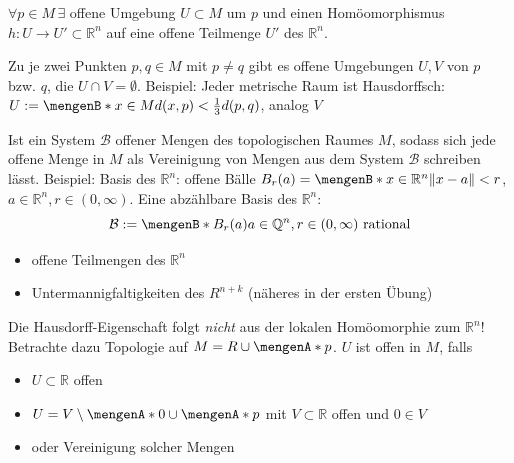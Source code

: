 \begin{description}
	\item{}  $\forall p \in M \, \exists$ offene Umgebung $U \subset M$ um $p$ und einen Homöomorphismus $h : U \to U' \subset \mathds{R}^n$  auf 
	eine offene Teilmenge $U'$ des $\mathds{R}^n$. 
	\item{}  Zu je zwei Punkten $p, q \in M$ mit $p \not= q$ gibt es offene Umgebungen $U,V$ von $p$ bzw. $q$, die $U \cap V = \emptyset$. Beispiel: Jeder
	metrische Raum ist Hausdorffsch: $U := \set[x \in M]{d(x,p)< \frac{1}{3} d(p,q) } $, analog $V$ \\
	\item{}  Ist ein System $\mathcal{B}$ offener Mengen des topologischen Raumes $M$, sodass sich jede offene Menge in $M$ als 
	Vereinigung von Mengen aus 
	dem System $\mathcal{B}$ schreiben lässt. \newline Beispiel: Basis des $\mathds{R}^n$: offene Bälle 
	$B_r(a) = \set[x \in \mathds{R}^n]{\norm{x-a} < r } $, $a \in \mathds{R}^n, r \in (0, \infty)$. Eine abzählbare Basis des $\mathds{R}^n$: 
	\[
		\mathcal{B} := \set[B_r(a)]{a \in \mathds{Q}^n, r \in (0,\infty) \text{ rational}} 
	\]
\end{description}


\begin{itemize}
	\item offene Teilmengen des $\mathds{R}^n$
	\item Untermannigfaltigkeiten des $R^{n+k}$ \hfill {\color{light_gray}(näheres in der ersten Übung)}
\end{itemize}

Die Hausdorff-Eigenschaft folgt \emph{nicht} aus der lokalen Homöomorphie zum $\mathds{R}^n$! Betrachte dazu  Topologie auf $M = R \cup \set{p} $. 
$U$ ist offen in $M$, falls\\

\begin{minipage}{0.55\textwidth}
	\begin{itemize}
		\item $U \subset \mathds{R}$ offen
		\item $U = V \setminus \set{0} \cup \set{p}$ mit $V \subset \mathds{R}$ offen und $0 \in V$
		\item oder Vereinigung solcher Mengen
	\end{itemize}
\end{minipage} \quad 
\begin{minipage}{0.35\textwidth}
	\captionsetup{type=figure, skip=1pt}
\end{minipage}

